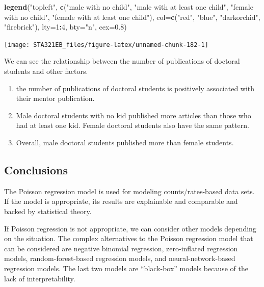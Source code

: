 \documentclass[
]{book}
\newenvironment{Shaded}{\begin{snugshade}}{\end{snugshade}}
\newcommand{\AttributeTok}[1]{\textcolor[rgb]{0.13,0.29,0.53}{#1}}
\newcommand{\DecValTok}[1]{\textcolor[rgb]{0.00,0.00,0.81}{#1}}
\newcommand{\FloatTok}[1]{\textcolor[rgb]{0.00,0.00,0.81}{#1}}
\newcommand{\FunctionTok}[1]{\textcolor[rgb]{0.13,0.29,0.53}{\textbf{#1}}}
\newcommand{\NormalTok}[1]{#1}
\newcommand{\SpecialCharTok}[1]{\textcolor[rgb]{0.81,0.36,0.00}{\textbf{#1}}}
\newcommand{\StringTok}[1]{\textcolor[rgb]{0.31,0.60,0.02}{#1}}
\begin{document}
\begin{Shaded}
\begin{Highlighting}[]
\FunctionTok{legend}\NormalTok{(}\StringTok{"topleft"}\NormalTok{, }\FunctionTok{c}\NormalTok{(}\StringTok{"male with no child"}\NormalTok{, }\StringTok{"male with at least one child"}\NormalTok{, }
                    \StringTok{"female with no child"}\NormalTok{, }\StringTok{"female with at least one child"}\NormalTok{), }
       \AttributeTok{col=}\FunctionTok{c}\NormalTok{(}\StringTok{"red"}\NormalTok{, }\StringTok{"blue"}\NormalTok{, }\StringTok{"darkorchid"}\NormalTok{, }\StringTok{"firebrick"}\NormalTok{),  }\AttributeTok{lty=}\DecValTok{1}\SpecialCharTok{:}\DecValTok{4}\NormalTok{, }\AttributeTok{bty=}\StringTok{"n"}\NormalTok{, }\AttributeTok{cex=}\FloatTok{0.8}\NormalTok{)}
\end{Highlighting}
\end{Shaded}

\begin{center}\texttt{[image: STA321EB\_files/figure-latex/unnamed-chunk-182-1]} \end{center}

We can see the relationship between the number of publications of doctoral students and other factors.

\begin{enumerate}
\def\labelenumi{\arabic{enumi}.}
\item
  the number of publications of doctoral students is positively associated with their mentor publication.
\item
  Male doctoral students with no kid published more articles than those who had at least one kid. Female doctoral students also have the same pattern.
\item
  Overall, male doctoral students published more than female students.
\end{enumerate}

\hypertarget{conclusions}{%
\subsection{Conclusions}\label{conclusions}}

The Poisson regression model is used for modeling counts/rates-based data sets. If the model is appropriate, its results are explainable and comparable and backed by statistical theory.

If Poisson regression is not appropriate, we can consider other models depending on the situation. The complex alternatives to the Poisson regression model that can be considered are negative binomial regression, zero-inflated regression models, random-forest-based regression models, and neural-network-based regression models. The last two models are ``black-box'' models because of the lack of interpretability.
\end{document}
